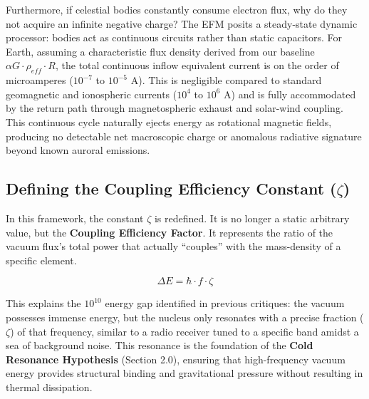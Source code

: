 \documentclass[11pt, a4paper]{article}
\begin{document}
Furthermore, if celestial bodies constantly consume electron flux, why do they not acquire an infinite negative charge? The EFM posits a steady-state dynamic processor: bodies act as continuous circuits rather than static capacitors. For Earth, assuming a characteristic flux density derived from our baseline $\alpha G \cdot \rho_{eff} \cdot R$, the total continuous inflow equivalent current is on the order of microamperes ($10^{-7}$ to $10^{-5}$ A). This is negligible compared to standard geomagnetic and ionospheric currents ($10^4$ to $10^6$ A) and is fully accommodated by the return path through magnetospheric exhaust and solar-wind coupling. This continuous cycle naturally ejects energy as rotational magnetic fields, producing no detectable net macroscopic charge or anomalous radiative signature beyond known auroral emissions.

\subsection{Defining the Coupling Efficiency Constant ($\zeta$)}
In this framework, the constant $\zeta$ is redefined. It is no longer a static arbitrary value, but the \textbf{Coupling Efficiency Factor}. It represents the ratio of the vacuum flux's total power that actually ``couples'' with the mass-density of a specific element. 

\begin{equation}
  \Delta E = \hbar \cdot f \cdot \zeta
\end{equation}

This explains the $10^{10}$ energy gap identified in previous critiques: the vacuum possesses immense energy, but the nucleus only resonates with a precise fraction ($\zeta$) of that frequency, similar to a radio receiver tuned to a specific band amidst a sea of background noise. This resonance is the foundation of the \textbf{Cold Resonance Hypothesis} (Section 2.0), ensuring that high-frequency vacuum energy provides structural binding and gravitational pressure without resulting in thermal dissipation.

\clearpage
\end{document}
